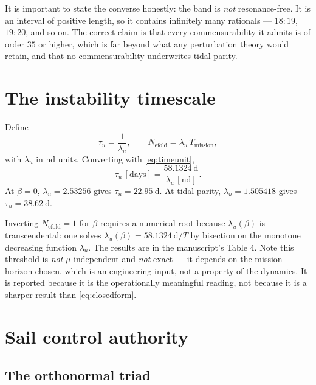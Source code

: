\documentclass[11pt,a4paper]{article}
\begin{document}
It is important to state the converse honestly: the band is \emph{not}
resonance-free. It is an interval of positive length, so it contains infinitely
many rationals --- $18{:}19$, $19{:}20$, and so on. The correct claim is that
every commensurability it admits is of order $35$ or higher, which is far beyond
what any perturbation theory would retain, and that no commensurability
underwrites tidal parity.

\section{The instability timescale}\label{sec:tau}

Define
\begin{equation}
  \tau_u = \frac{1}{\lambda_u}, \qquad
  N_{\mathrm{efold}} = \lambda_u\,T_{\mathrm{mission}} ,
  \label{eq:tau}
\end{equation}
with $\lambda_u$ in nd units. Converting with \eqref{eq:timeunit},
\begin{equation}
  \tau_u\,[\mathrm{days}] = \frac{\SI{58.1324}{\day}}{\lambda_u\,[\mathrm{nd}]} .
\end{equation}
At $\beta=0$, $\lambda_u=2.53256$ gives $\tau_u=\SI{22.95}{\day}$. At tidal
parity, $\lambda_u=1.505418$ gives $\tau_u=\SI{38.62}{\day}$.

Inverting $N_{\mathrm{efold}}=1$ for $\beta$ requires a numerical root because
$\lambda_u(\beta)$ is transcendental: one solves
$\lambda_u(\beta)=\SI{58.1324}{\day}/T$ by bisection on the monotone decreasing
function $\lambda_u$. The results are in the manuscript's Table 4. Note this
threshold is \emph{not} $\mu$-independent and \emph{not} exact --- it depends on
the mission horizon chosen, which is an engineering input, not a property of the
dynamics. It is reported because it is the operationally meaningful reading,
not because it is a sharper result than \eqref{eq:closedform}.

\section{Sail control authority}\label{sec:control}

\subsection{The orthonormal triad}
\end{document}
